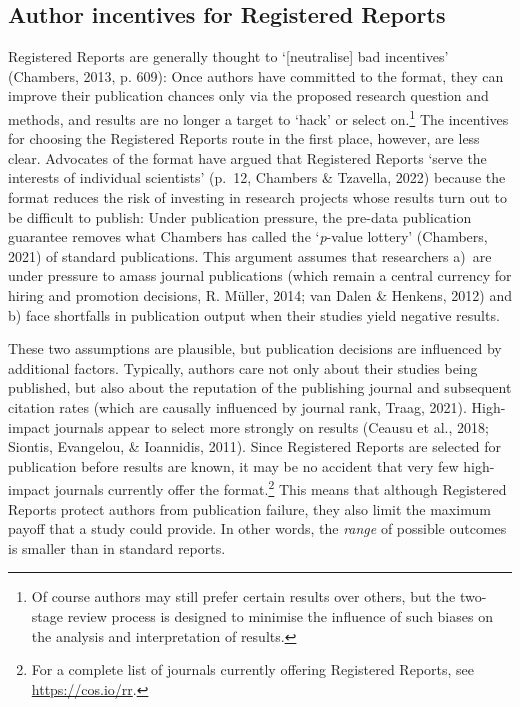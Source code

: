 \documentclass[
  british,
  a4paper,
  ,man,floatsintext]{apa6}
\begin{document}
\subsection{Author incentives for Registered Reports}\label{author-incentives-for-registered-reports}

Registered Reports are generally thought to `{[}neutralise{]} bad incentives' (Chambers, 2013, p. 609):
Once authors have committed to the format, they can improve their publication chances only via the proposed research question and methods, and results are no longer a target to `hack' or select on.\footnote{Of course authors may still prefer certain results over others, but the two-stage review process is designed to minimise the influence of such biases on the analysis and interpretation of results.}
The incentives for choosing the Registered Reports route in the first place, however, are less clear.
Advocates of the format have argued that Registered Reports `serve the interests of individual scientists' (p.~12, Chambers \& Tzavella, 2022) because the format reduces the risk of investing in research projects whose results turn out to be difficult to publish:
Under publication pressure, the pre-data publication guarantee removes what Chambers has called the `\emph{p}-value lottery' (Chambers, 2021) of standard publications.
This argument assumes that researchers \mbox{a) are} under pressure to amass journal publications (which remain a central currency for hiring and promotion decisions, R. Müller, 2014; van Dalen \& Henkens, 2012) and b) face shortfalls in publication output when their studies yield negative results.

These two assumptions are plausible, but publication decisions are influenced by additional factors.
Typically, authors care not only about their studies being published, but also about the reputation of the publishing journal and subsequent citation rates (which are causally influenced by journal rank, Traag, 2021).
High-impact journals appear to select more strongly on results (Ceausu et al., 2018; Siontis, Evangelou, \& Ioannidis, 2011).
Since Registered Reports are selected for publication before results are known, it may be no accident that very few high-impact journals currently offer the format.\footnote{For a complete list of journals currently offering Registered Reports, see \url{https://cos.io/rr}.}
This means that although Registered Reports protect authors from publication failure, they also limit the maximum payoff that a study could provide.
In other words, the \emph{range} of possible outcomes is smaller than in standard reports.
\end{document}
